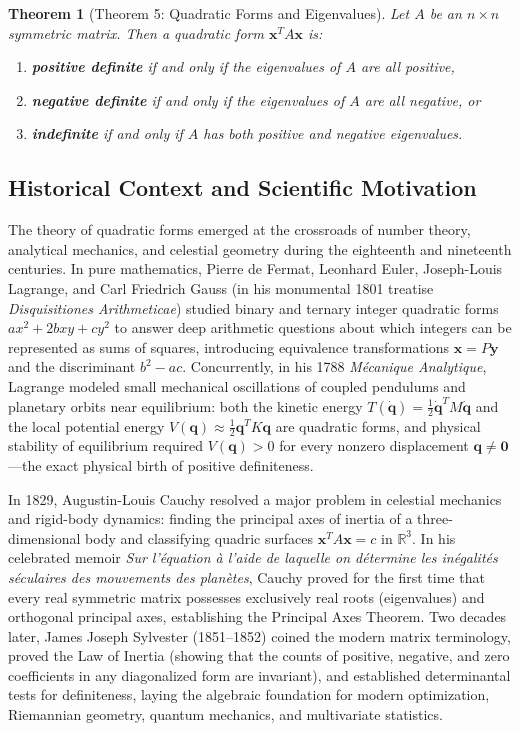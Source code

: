 \documentclass[11pt, letterpaper]{article}
\newtheorem{theorem}{Theorem}[section]
\theoremstyle{definition}
\theoremstyle{remark}
\newcommand{\R}{\mathbb{R}}
\begin{document}
\begin{theorem}[Theorem 5: Quadratic Forms and Eigenvalues]
Let $A$ be an $n \times n$ symmetric matrix. Then a quadratic form $\mathbf{x}^T A \mathbf{x}$ is:
\begin{enumerate}[label=\alph*.]
    \item \textbf{positive definite} if and only if the eigenvalues of $A$ are all positive,
    \item \textbf{negative definite} if and only if the eigenvalues of $A$ are all negative, or
    \item \textbf{indefinite} if and only if $A$ has both positive and negative eigenvalues.
\end{enumerate}
\end{theorem}

\subsection{Historical Context and Scientific Motivation}

The theory of quadratic forms emerged at the crossroads of number theory, analytical mechanics, and celestial geometry during the eighteenth and nineteenth centuries. In pure mathematics, Pierre de Fermat, Leonhard Euler, Joseph-Louis Lagrange, and Carl Friedrich Gauss (in his monumental 1801 treatise \emph{Disquisitiones Arithmeticae}) studied binary and ternary integer quadratic forms $ax^2 + 2bxy + cy^2$ to answer deep arithmetic questions about which integers can be represented as sums of squares, introducing equivalence transformations $\mathbf{x} = P\mathbf{y}$ and the discriminant $b^2 - ac$. Concurrently, in his 1788 \emph{M\'{e}canique Analytique}, Lagrange modeled small mechanical oscillations of coupled pendulums and planetary orbits near equilibrium: both the kinetic energy $T(\dot{\mathbf{q}}) = \frac{1}{2}\dot{\mathbf{q}}^T M \dot{\mathbf{q}}$ and the local potential energy $V(\mathbf{q}) \approx \frac{1}{2}\mathbf{q}^T K \mathbf{q}$ are quadratic forms, and physical stability of equilibrium required $V(\mathbf{q}) > 0$ for every nonzero displacement $\mathbf{q} \neq \mathbf{0}$---the exact physical birth of positive definiteness.

In 1829, Augustin-Louis Cauchy resolved a major problem in celestial mechanics and rigid-body dynamics: finding the principal axes of inertia of a three-dimensional body and classifying quadric surfaces $\mathbf{x}^T A \mathbf{x} = c$ in $\R^3$. In his celebrated memoir \emph{Sur l'\'{e}quation \`{a} l'aide de laquelle on d\'{e}termine les in\'{e}galit\'{e}s s\'{e}culaires des mouvements des plan\`{e}tes}, Cauchy proved for the first time that every real symmetric matrix possesses exclusively real roots (eigenvalues) and orthogonal principal axes, establishing the Principal Axes Theorem. Two decades later, James Joseph Sylvester (1851--1852) coined the modern matrix terminology, proved the Law of Inertia (showing that the counts of positive, negative, and zero coefficients in any diagonalized form are invariant), and established determinantal tests for definiteness, laying the algebraic foundation for modern optimization, Riemannian geometry, quantum mechanics, and multivariate statistics.
\end{document}
